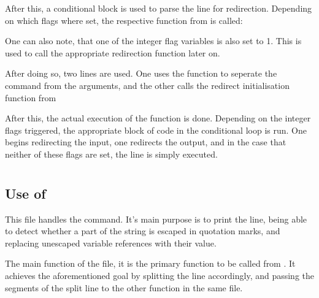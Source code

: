\documentclass[12pt, a4paper]{report}
\begin{document}
                \clearpage

                After this, a conditional  block is used to parse the line
                for redirection. Depending on which  flags where set, the
                respective function from  is called:

                \begingroup
                \fontsize{10pt}{10pt}\selectfont
                \endgroup
                One can also note, that one of the integer flag variables  is
                also set to 1. This is used to call the appropriate redirection function
                later on.

                After doing so, two lines are used. One uses the  function to
                seperate the command from the arguments, and the other calls the 
                redirect initialisation function from 

                \begingroup
                \fontsize{10pt}{10pt}\selectfont
                \endgroup
                After this, the actual execution of the function is done. Depending on 
                the integer flags triggered, the appropriate block of code in the
                conditional loop is run. One begins redirecting the input, one redirects
                the output, and in the case that neither of these flags are set, the
                line is simply executed.

                \begingroup
                \fontsize{10pt}{10pt}\selectfont
                \endgroup

        \section{}
            \subsection{Use of }
                This file handles the  command. It's main purpose
                is to print the line, being able to detect whether a part of
                the string is escaped in quotation marks, and replacing 
                unescaped variable references with their value.

                The main function of the file, it is the primary function to
                be called from . It achieves the aforementioned
                goal by splitting the line accordingly, and passing the 
                segments of the split line to the other function in the same file.
\end{document}
